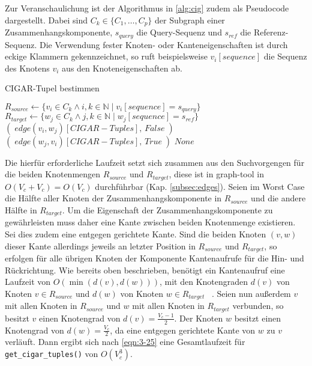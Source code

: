 Zur Veranschaulichung ist der Algorithmus in \ref{alg:cig} zudem als Pseudocode dargestellt. Dabei sind $ C_{k} \in \{C_{1}, \dots ,C_{p}\} $ der Subgraph einer Zusammenhangskomponente, $ s_{query} $ die Query-Sequenz und $ s_{ref} $ die Referenz-Sequenz. Die Verwendung fester Knoten- oder Kanteneigenschaften ist durch eckige Klammern gekennzeichnet, so ruft beispielsweise $v_{i}[sequence]$ die Sequenz des Knotens $v_{i}$ aus den Knoteneigenschaften ab. \\

\begin{algorithm}[H]
	\caption{CIGAR-Tupel bestimmen}  \label{alg:cig}
	\begin{algorithmic}[1]	
		\State $ R_{source} \gets \{v_{i} \in C_{k} \wedge i,k \in \mathds{N} \; |\; v_{i}[sequence]= s_{query} \}$
		\State $ R_{target} \gets \{w_{j} \in C_{k} \wedge j,k \in \mathds{N} \; |\; w_{j}[sequence]= s_{ref} \}$
		            \State \Return $ (\;edge(v_{i}, w_{j})[CIGAR-Tuples],\, False\;) $		    
		        \EndIf
		            \State \Return $ (\;edge(w_{j}, v_{i})[CIGAR-Tuples],\, True\;) $		
		        \EndIf
		    \EndFor
		\EndFor
		\State \Return $ None $
		\EndFunction
	\end{algorithmic}
\end{algorithm}

Die hierfür erforderliche Laufzeit setzt sich zusammen aus den Suchvorgengen für die beiden Knotenmengen $ R_{source} $ und $ R_{target} $, diese ist in graph-tool in $O(V_{c} + V_{c}) = O(V_{c})$ durchführbar (Kap. \ref{subsec:edges}). Seien im Worst Case die Hälfte aller Knoten der Zusammenhangskomponente in $ R_{source} $ und die andere Hälfte in $ R_{target} $. Um die Eigenschaft der Zusammenhangskomponente zu gewährleisten muss daher eine Kante zwischen beiden Knotenmenge existieren. Sei dies zudem eine entgegen gerichtete Kante. Sind die beiden Knoten $ (v, w) $ dieser Kante allerdings jeweils an letzter Position in $ R_{source} $ und $ R_{target} $, so erfolgen für alle übrigen Knoten der Komponente Kantenaufrufe für die Hin- und Rückrichtung. Wie bereits oben beschrieben, benötigt ein Kantenaufruf eine Laufzeit von $ O(\min (d(v), d(w)))$, mit den Knotengraden $d(v) $ von Knoten $v \in R_{source}$ und $ d(w) $ von Knoten $ w \in R_{target} $ ~\cite{docs_graph_tool}. Seien nun außerdem $ v $ mit allen Knoten in $ R_{source} $ und $ w $ mit allen Knoten in $ R_{target} $ verbunden, so besitzt $v$ einen Knotengrad von $ d(v) = \frac{V_{c}-1}{2} $. Der Knoten $ w $ besitzt einen Knotengrad von $ d(w) = \frac{V_{c}}{2} $, da eine entgegen gerichtete Kante von $w$ zu $v$ verläuft. Dann ergibt sich nach \eqref{eqn:3-25} eine Gesamtlaufzeit für \lstinline|get_cigar_tuples()| von $ O(V_{c}^3) $. \\

